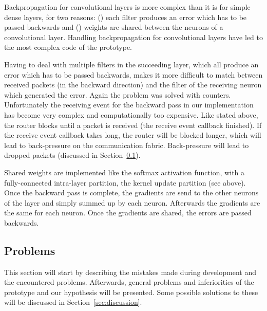 \documentclass[]{article}
\begin{document}
Backpropagation for convolutional layers is more complex than it is
for simple dense layers, for two reasons: () each
filter produces an error which has to be passed backwards and
() weights are shared between the neurons of a
convolutional layer.
Handling backpropagation for convolutional layers have led to the
most complex code of the prototype.

Having to deal with multiple filters in the succeeding layer, which
all produce an error which has to be passed backwards, makes it more
difficult to match between received packets (in the backward
direction) and the filter of the receiving neuron which generated the
error.
Again the problem was solved with counters.
Unfortunately the receiving event for the backward pass in our
implementation has become very complex and computationally too
expensive.
Like stated above, the router blocks until a packet is received
(the receive event callback finished).
If the receive event callback takes long, the router will be blocked
longer, which will lead to back-pressure on the communication
fabric.
Back-pressure will lead to dropped packets (discussed in
Section~\ref{subsec:problems}).

Shared weights are implemented like the softmax activation function,
with a fully-connected intra-layer partition, the kernel update
partition (see above).
Once the backward pass is complete, the gradients are send to the
other neurons of the layer and simply summed up by each neuron.
Afterwards the gradients are the same for each neuron.
Once the gradients are shared, the errors are passed backwards.



\subsection{Problems} %
\label{subsec:problems}

This section will start by describing the mistakes made during
development and the encountered problems.
Afterwards, general problems and inferiorities of the prototype and
our hypothesis will be presented.
Some possible solutions to these will be discussed in
Section~\ref{sec:discussion}.
\end{document}
